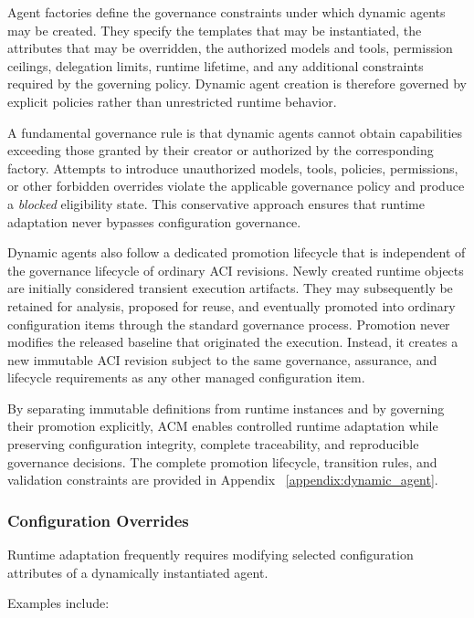 \documentclass[10pt]{article}
\begin{document}
Agent factories define the governance constraints under which dynamic agents may be created. They specify the templates that may be instantiated, the attributes that may be overridden, the authorized models and tools, permission ceilings, delegation limits, runtime lifetime, and any additional constraints required by the governing policy. Dynamic agent creation is therefore governed by explicit policies rather than unrestricted runtime behavior.

A fundamental governance rule is that dynamic agents cannot obtain capabilities exceeding those granted by their creator or authorized by the corresponding factory. Attempts to introduce unauthorized models, tools, policies, permissions, or other forbidden overrides violate the applicable governance policy and produce a \textit{blocked} eligibility state. This conservative approach ensures that runtime adaptation never bypasses configuration governance.

Dynamic agents also follow a dedicated promotion lifecycle that is independent of the governance lifecycle of ordinary ACI revisions. Newly created runtime objects are initially considered transient execution artifacts. They may subsequently be retained for analysis, proposed for reuse, and eventually promoted into ordinary configuration items through the standard governance process. Promotion never modifies the released baseline that originated the execution. Instead, it creates a new immutable ACI revision subject to the same governance, assurance, and lifecycle requirements as any other managed configuration item.

By separating immutable definitions from runtime instances and by governing their promotion explicitly, ACM enables controlled runtime adaptation while preserving configuration integrity, complete traceability, and reproducible governance decisions. The complete promotion lifecycle, transition rules, and validation constraints are provided in Appendix ~\ref{appendix:dynamic_agent}.

\subsubsection{Configuration Overrides}

Runtime adaptation frequently requires modifying selected configuration
attributes of a dynamically instantiated agent.

Examples include:
\end{document}
